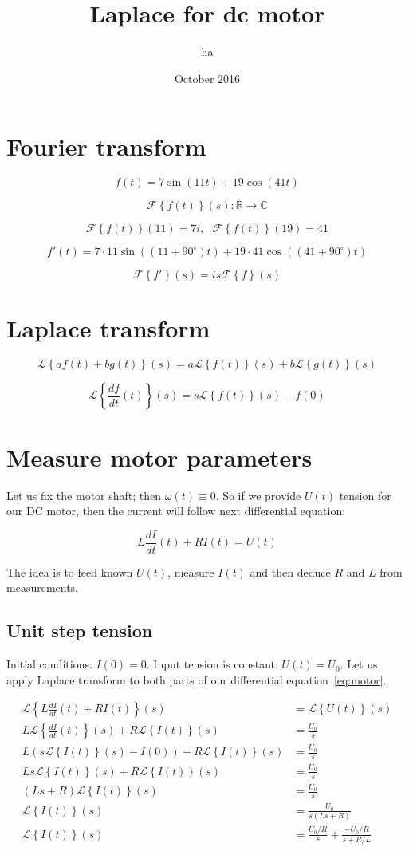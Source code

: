 \documentclass{article}
\title{Laplace for dc motor}
\author{ha}
\date{October 2016}
\newcommand{\Fourier}[1]{\mathcal{F}\left\{#1\right\}(s)}
\newcommand{\Laplace}[1]{\mathcal{L}\left\{#1\right\}(s)}
\begin{document}
\maketitle

\section{Fourier transform}
$$
f(t) = 7\sin(11 t) + 19 \cos(41 t)
$$

$$
\Fourier{f(t)} : \mathbb{R} \rightarrow \mathbb{C}
$$

$$
\mathcal{F}\left\{f(t)\right\}(11) = 7i, ~~~ \mathcal{F}\left\{f(t)\right\}(19) = 41
$$

$$
f'(t) = 7 \cdot 11 \sin((11+90^\circ)t) +  19\cdot 41\cos((41+90^\circ)t) 
$$

$$
\Fourier{f'} = i s \Fourier{f}
$$

\section{Laplace transform}

$$
    \Laplace{af(t) + bg(t)} = a\Laplace{f(t)} + b\Laplace{g(t)}
$$

$$
    \Laplace{\frac{df}{dt}(t)} = s\Laplace{f(t)} - f(0)
$$

\section{Measure motor parameters}

Let us fix the motor shaft; then $\omega(t)\equiv 0$.
So if we provide $U(t)$ tension for our DC motor, then the current will follow next differential equation:

\begin{equation}
    L \frac{dI}{dt}(t) + RI(t) = U(t)
\label{eq:motor}
\end{equation}

The idea is to feed known $U(t)$, measure $I(t)$ and then deduce $R$ and $L$ from measurements.

\subsection{Unit step tension}

Initial conditions: $I(0) = 0$. Input tension is constant: $U(t) = U_0$.
Let us apply Laplace transform to both parts of our differential equation~\eqref{eq:motor}. 

\begin{align*}
    \Laplace{L \frac{dI}{dt}(t) + RI(t)} & = \Laplace{U(t)} \\
    L\Laplace{\frac{dI}{dt}(t)} + R\Laplace{I(t)} & = \frac{U_0}{s} \\
    L(s\Laplace{I(t)} - I(0)) + R\Laplace{I(t)} & = \frac{U_0}{s} \\
    Ls\Laplace{I(t)} + R\Laplace{I(t)} & = \frac{U_0}{s} \\
    (Ls+R)\Laplace{I(t)}  & = \frac{U_0}{s} \\
    \Laplace{I(t)}  & = \frac{U_0}{s(Ls+R)} \\
    \Laplace{I(t)}  & = \frac{U_0/R}{s} + \frac{-U_0/R}{s+R/L}
\end{align*}
\end{document}
